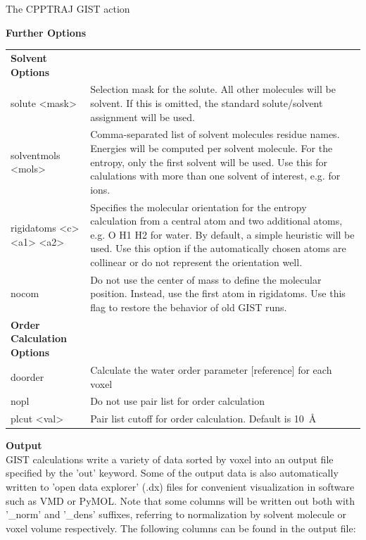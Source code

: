 \documentclass[9pt,tutorial,pubversion]{livecoms}
\begin{document}
\begin{Checklists*}[h!]
\begin{checklist}{The CPPTRAJ GIST action}
	
\textbf{Further Options}\\
\begin{tabularx}{\textwidth}{@{} l X @{}}
\toprule

\textbf{Solvent Options} &\\
solute <mask> & Selection mask for the solute. All other molecules will be solvent. If this is omitted, the standard solute/solvent assignment will be used. \\
solventmols <mols> &Comma-separated list of solvent molecules residue names. Energies will be computed per solvent molecule. For the entropy, only the first solvent will be used. Use this for calulations with more than one solvent of interest, e.g. for  ions. \\
rigidatoms <c> <a1> <a2> & Specifies the molecular orientation for the entropy calculation from a central atom and two additional atoms, e.g. O H1 H2 for water. By default, a simple heuristic will be used.  
Use this option if the automatically chosen atoms are collinear or do not represent the orientation well. \\
nocom & Do not use the center of mass to define the molecular position. Instead, use the first atom in rigidatoms. Use this flag to restore the behavior of old GIST runs. \\
\textbf{Order Calculation Options} &\\
doorder & Calculate the water order parameter [reference] for each voxel\\
\qquad nopl & Do not use pair list for order calculation\\
\qquad plcut <val> & Pair list cutoff for order calculation. Default is \qty{10}{\angstrom}\\
\bottomrule
\end{tabularx}   
\medskip


\textbf{Output}\\
GIST calculations write a variety of data sorted by voxel into an output file specified by the 'out' keyword. 
Some of the output data is also automatically written to 'open data explorer' (.dx) files for convenient visualization in software such as VMD or PyMOL. 
Note that some columns will be written out both with '\_norm' and '\_dens' suffixes, referring to normalization by solvent molecule or voxel volume respectively.
The following columns can be found in the output file:
\medskip



\end{checklist}
\end{Checklists*}
\end{document}
